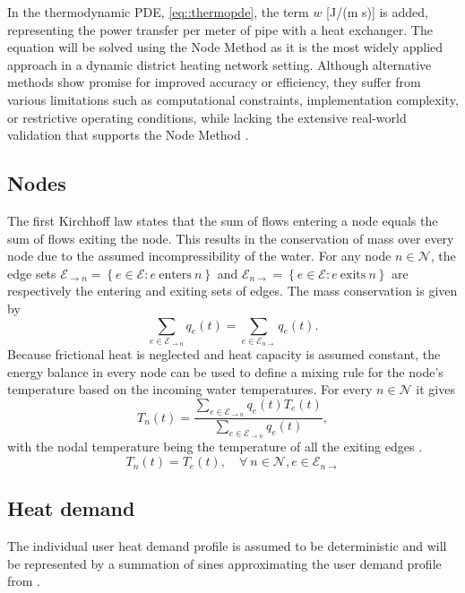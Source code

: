 In the thermodynamic PDE, \ref{eq::thermopde}, the term $w$ [J/(m s)] is added, representing the power transfer per meter of pipe with a heat exchanger. The equation will be solved using the Node Method as it is the most widely applied approach in a dynamic district heating network setting. Although alternative methods show promise for improved accuracy or efficiency, they suffer from various limitations such as computational constraints, implementation complexity, or restrictive operating conditions, while lacking the extensive real-world validation that supports the Node Method \cite{KUNTUAROVA}.

\subsection{Nodes}
The first Kirchhoff law states that the sum of flows entering a node equals the sum of flows exiting the node. This results in the conservation of mass over every node due to the assumed incompressibility of the water. For any node $n \in \mathcal{N}$, the edge sets $\mathcal{E}_{\rightarrow n} = \left\{ e \in \mathcal{E} : e \  \text{enters} \ n\right\}$ and $\mathcal{E}_{n\rightarrow } = \left\{ e \in \mathcal{E} : e \  \text{exits} \ n\right\}$ are respectively the entering and exiting sets of edges. The mass conservation is given by
\begin{equation}
    \sum_{e  \in \mathcal{E}_{\rightarrow n}} q_e(t) = \sum_{e  \in \mathcal{E}_{n \rightarrow}} q_e(t).
\end{equation}
Because frictional heat is neglected and heat capacity is assumed constant, the energy balance in every node can be used to define a mixing rule for the node's temperature based on the incoming water temperatures. For every $n \in \mathcal{N}$ it gives
\begin{equation}
    T_n(t) = \frac{\sum_{e  \in \mathcal{E}_{\rightarrow n}} q_e(t) T_e(t)}{\sum_{e  \in \mathcal{E}_{\rightarrow n}} q_e(t)},
\end{equation}
with the nodal temperature being the temperature of all the exiting edges \cite{Krug2020}. 
\begin{equation}
    T_n(t) = T_e(t), \quad \forall \ n \in \mathcal{N}, e \in \mathcal{E}_{n \rightarrow} 
\end{equation}

\subsection{Heat demand}
The individual user heat demand profile is assumed to be deterministic and will be represented by a summation of sines approximating the user demand profile from \cite{Krug2020}. 

